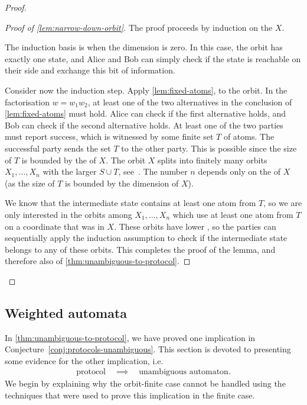 \begin{proof}
\begin{proof}[Proof of \cref{lem:narrow-down-orbit}]
  The proof proceeds by induction on the  $X$.
    
  The induction basis is when the dimension is zero. In this case, the orbit
  has exactly one state, and Alice and Bob can simply check  if the state is
  reachable on their side and exchange this bit of information.

  Consider now the induction step. Apply \cref{lem:fixed-atoms}, to the
  orbit. In the factorisation $w = w_1 w_2$, at least one of the two
  alternatives in the conclusion of \cref{lem:fixed-atoms} must hold. Alice
  can check if the first alternative holds, and Bob can check if the second
  alternative holds.  At least one of the two parties must report success,
  which is witnessed by some finite set $T$ of atoms. The successful party sends the
  set $T$ to the other party. This is possible since the size of $T$ is
  bounded by the  of $X$. 
  The orbit $X$ splits into finitely many
  orbits $X_1,\ldots,X_n$ with the larger  $S \cup T$, see~\cite[Lemma
  10.9]{bojanczyk_slightly}. The number $n$ depends only on the  
  of $X$ (as the size of $T$ is bounded by the dimension of $X$).

  We know that the intermediate state contains at least one atom from $T$, so
  we are only interested in the orbits among $X_1,\ldots,X_n$ which use at
  least one atom from $T$ on a coordinate that was  in $X$. 
  These orbits
  have lower , so the parties can sequentially apply the induction
  assumption to check if the intermediate state belongs to any of these
  orbits. This completes the proof of the lemma, and therefore also of
  \cref{thm:unambiguous-to-protocol}.
\end{proof}
\end{proof}


\subsection{Weighted automata}
\label{sec:weighted-automata-atoms}

\AP
In \cref{thm:unambiguous-to-protocol}, we have proved one implication in Conjecture~\ref{conj:protocols-unambiguous}.
This section is devoted to presenting some evidence for the other implication, i.e.
\begin{align}\label{eq:missing-orbit-finite-implication}
\text{protocol} \quad \implies \quad \text{unambiguous automaton}.
\end{align}
We begin by explaining why the orbit-finite case cannot be handled using the
techniques that were used to prove this implication in the finite case.

